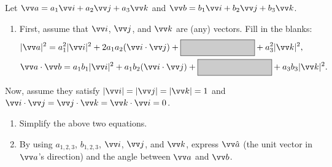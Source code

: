 \documentclass[11pt,pdfa,lastpage]{MishoNote}
\begin{document}
\begin{problems}
  \Problem[B] Let $ \vc a=a_1\vc i+a_2\vc j+a_3\vc k$ and $\vc b=b_1\vc i+b_2\vc j+b_3\vc k$.
   \label{q:ipexpand}
  \begin{enumerate}
    \item First, assume that $\vc i$, $\vc j$, and $\vc k$ are (any) vectors. Fill in the blanks:
    \begin{align*}
      &|\vc a|^2=a_1^2|\vc i|^2+2a_1a_2(\vc i\cdot\vc j)+\GrayBox{\strut\hspace{8em}}+a_3^2|\vc k|^2,\\
      &\vc a\cdot\vc b=a_1b_1|\vc i|^2+a_1b_2(\vc i\cdot\vc j)+\GrayBox{\strut\hspace{8em}}+a_3b_3|\vc k|^2.
    \end{align*}
  \end{enumerate}
  Now, assume they satisfy $|\vc i|=|\vc j|=|\vc k|=1$ and $\vc i\cdot\vc j=\vc j\cdot\vc k=\vc k\cdot\vc i=0$.
  \begin{enumerate}[resume]
    \item Simplify the above two equations.
    \item By using $a_{1,2,3}$, $b_{1,2,3}$, $\vc i$, $\vc j$, and $\vc k$, express $\vc{\hat a}$ (the unit vector in $\vc a$'s direction) and the angle between $\vc a$ and $\vc b$.
  \end{enumerate}


\end{problems}
\end{document}
